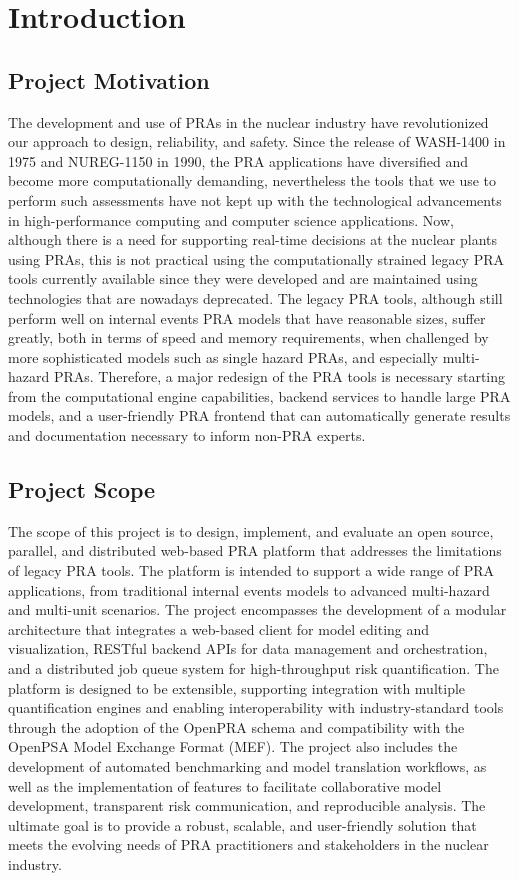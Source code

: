 \chapter{Introduction}

\section{Project Motivation}
The development and use of PRAs in the nuclear industry have revolutionized our approach to design, reliability, and safety. Since the release of WASH-1400 in 1975 and NUREG-1150 in 1990, the PRA applications have diversified and become more computationally demanding, nevertheless the tools that we use to perform such assessments have not kept up with the technological advancements in high-performance computing and computer science applications. Now, although there is a need for supporting real-time decisions at the nuclear plants using PRAs, this is not practical using the computationally strained legacy PRA tools currently available since they were developed and are maintained using technologies that are nowadays deprecated. The legacy PRA tools, although still perform well on internal events PRA models that have reasonable sizes, suffer greatly, both in terms of speed and memory requirements, when challenged by more sophisticated models such as single hazard PRAs, and especially multi-hazard PRAs. Therefore, a major redesign of the PRA tools is necessary starting from the computational engine capabilities, backend services to handle large PRA models, and a user-friendly PRA frontend that can automatically generate results and documentation necessary to inform non-PRA experts.

\section{Project Scope}
The scope of this project is to design, implement, and evaluate an open source, parallel, and distributed web-based PRA platform that addresses the limitations of legacy PRA tools. The platform is intended to support a wide range of PRA applications, from traditional internal events models to advanced multi-hazard and multi-unit scenarios. The project encompasses the development of a modular architecture that integrates a web-based client for model editing and visualization, RESTful backend APIs for data management and orchestration, and a distributed job queue system for high-throughput risk quantification. The platform is designed to be extensible, supporting integration with multiple quantification engines and enabling interoperability with industry-standard tools through the adoption of the OpenPRA schema and compatibility with the OpenPSA Model Exchange Format (MEF). The project also includes the development of automated benchmarking and model translation workflows, as well as the implementation of features to facilitate collaborative model development, transparent risk communication, and reproducible analysis. The ultimate goal is to provide a robust, scalable, and user-friendly solution that meets the evolving needs of PRA practitioners and stakeholders in the nuclear industry.

